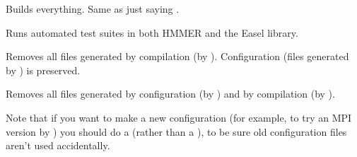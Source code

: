 \begin{sreitems}{}
\item[\emprog{all}]
  Builds everything. Same as just saying .

\item[\emprog{check}]
  Runs automated test suites in both HMMER and the Easel library.

\item[\emprog{clean}]
  Removes all files generated by compilation (by
  ). Configuration (files generated by
  ) is preserved.

\item[\emprog{distclean}]
Removes all files generated by configuration (by )
and by compilation (by ). 

Note that if you want to make a new configuration (for example, to try
an MPI version by ) you should
do a  (rather than a ), to be
sure old configuration files aren't used accidentally.
\end{sreitems}




